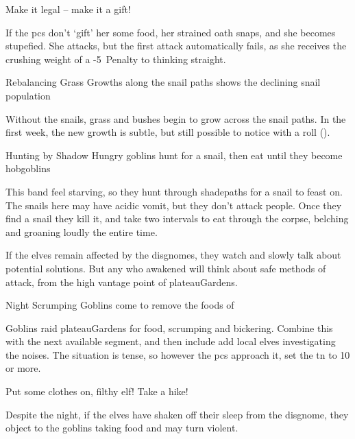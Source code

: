 \begin{multicols}{2}
\begin{boxtext}
\begin{speechtext}
    Make it legal -- make it a gift!
  \end{speechtext}
\end{boxtext}

If the \glspl{pc} don't `gift' her some food, her strained oath snaps, and she becomes stupefied.
She attacks, but the first attack automatically fails, as she receives the crushing weight of a -5~Penalty to thinking straight.

%

{Rebalancing Grass}%
{Growths along the snail paths shows the declining snail population}%

Without the snails, grass and bushes begin to grow across the snail paths.
In the first week, the new growth is subtle, but still possible to notice with a  roll (\tn[12]).

{Hunting by Shadow}%
{Hungry goblins hunt for a snail, then eat until they become hobgoblins}%

This band feel starving, so they hunt through \gls{shadepaths} for a snail to feast on.
The snails here may have acidic vomit, but they don't attack people.
Once they find a snail they kill it, and take two \glspl{interval} to eat through the corpse, belching and groaning loudly the entire time.

If the elves remain affected by the \glspl{disgnome}, they watch and slowly talk about potential solutions.
But any who awakened will think about safe methods of attack, from the high vantage point of \gls{plateauGardens}.

{Night Scrumping}%
{Goblins come to remove the foods of }%

Goblins raid \gls{plateauGardens} for food, scrumping and bickering.
Combine this with the next available \gls{segment}, and then include add local elves investigating the noises.
The situation is tense, so however the \glspl{pc} approach it, set the \gls{tn} to 10 or more.


\begin{speechtext}
  Put some clothes on, filthy elf!
  Take a hike!
\end{speechtext}

Despite the night, if the elves have shaken off their sleep from the \gls{disgnome}, they object to the goblins taking food and may turn violent.


\end{multicols}
